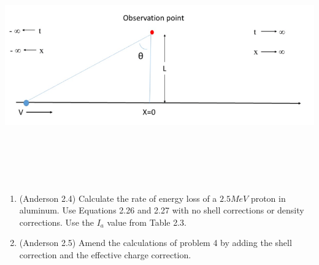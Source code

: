 \documentclass{hw}
\begin{document}
	\includegraphics[width=15cm,height=10cm,keepaspectratio]{ne551_03_fig_01}

\solution


	\begin{enumerate}
		\item (Anderson 2.4) Calculate the rate of energy loss of a $ 2.5 MeV $ proton in aluminum. Use Equations 2.26 and 2.27 with no shell corrections or density corrections. Use the $ I_a $ value from Table 2.3.
		\item (Anderson 2.5) Amend the calculations of problem 4 by adding the shell correction and the effective charge correction.
	\end{enumerate}

\solution
\end{document}
